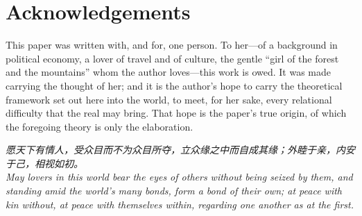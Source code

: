 \newpage
\section*{\textcolor{rosedeep}{Acknowledgements}}

This paper was written with, and for, one person. To her---of a background in political economy, a lover of travel and of culture, the gentle ``girl of the forest and the mountains'' whom the author loves---this work is owed. It was made carrying the thought of her; and it is the author's hope to carry the theoretical framework set out here into the world, to meet, for her sake, every relational difficulty that the real may bring. That hope is the paper's true origin, of which the foregoing theory is only the elaboration.

\vspace{1.2em}
\begin{center}
\begin{minipage}{0.8\linewidth}
\centering
{\cjk\itshape\color{rose}
愿天下有情人，受众目而不为众目所夺，立众缘之中而自成其缘；外睦于亲，内安于己，相视如初。}\\[0.8em]
{\itshape\color{rose}
May lovers in this world bear the eyes of others without being seized by them, and standing amid the world's many bonds, form a bond of their own; at peace with kin without, at peace with themselves within, regarding one another as at the first.}
\end{minipage}
\end{center}

\newpage
\goldrule
{\color{rose}
\renewcommand{\refname}{\textcolor{rosedeep}{References}}
\small
}
